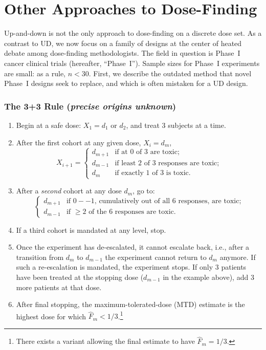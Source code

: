 

\section{Other Approaches to Dose-Finding}\label{sec:other}

Up-and-down is not the only approach to dose-finding on a discrete dose set. As a contrast to UD, we now focus on a family of designs at the center of heated debate among dose-finding methodologists. The field in question is Phase~I cancer clinical trials (hereafter, ``Phase~I''). Sample sizes for Phase~I experiments are small: as a rule, $n<30$. First, we describe the outdated method that novel Phase~I designs seek to replace, and which is often \citep{Rogat:etal:oped:2007,Zack:stag:2009} mistaken for a UD design.

\subsubsection{The 3+3 Rule (\emph{precise origins unknown})}

\begin{enumerate}
\item Begin at a safe dose: $X_1=d_1$ or $d_2$, and treat 3 subjects at a time.
\item After the first cohort at any given dose, $X_i=d_m$,
\begin{equation*}
X_{i+1}=
\begin{cases}
    d_{m+1} &\textrm{if at $0$ of $3$ are toxic;}\\
    d_{m-1} &\textrm{if least $2$ of $3$ responses are toxic;} \\
    d_m &\textrm{if exactly $1$ of $3$ is toxic.}
\end{cases}
\end{equation*}
\item After a \emph{second} cohort at any dose $d_m$, go to:
\begin{equation*}
\begin{cases}
    d_{m+1} &\textrm{if $0--1$, cumulatively out of all $6$ responses, are toxic;}\\
    d_{m-1} &\textrm{if $\geq 2$ of the $6$ responses are toxic.}
\end{cases}
\end{equation*}
\item If a third cohort is mandated at any level, stop.
\item Once the experiment has de-escalated, it cannot escalate back, i.e., after a transition from $d_m$ to $d_{m-1}$ the experiment cannot return to $d_m$ anymore. If such a re-escalation is mandated, the experiment stops. If only $3$ patients have been treated at the stopping dose ($d_{m-1}$ in the example above), add $3$ more patients at that dose.
\item After final stopping, the maximum-tolerated-dose (MTD) estimate is the highest dose for which $\hat{F}_m<1/3$.\footnote{There exists a variant allowing the final estimate to have $\hat{F}_m=1/3$.} 
\end{enumerate}

